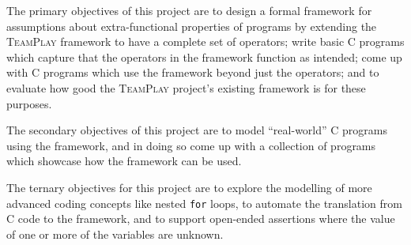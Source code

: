 The primary objectives of this project are to design a formal framework for assumptions about extra-functional properties of programs by extending the \textsc{TeamPlay} framework to have a complete set of operators; write basic C programs which capture that the operators in the framework function as intended; come up with C programs which use the framework beyond just the operators; and to evaluate how good the \textsc{TeamPlay} project's existing framework is for these purposes.

The secondary objectives of this project are to model ``real-world'' C programs using the framework, and in doing so come up with a collection of programs which showcase how the framework can be used.

The ternary objectives for this project are to explore the modelling of more advanced coding concepts like nested \texttt{for} loops, to automate the translation from C code to the framework, and to support open-ended assertions where the value of one or more of the variables are unknown.
